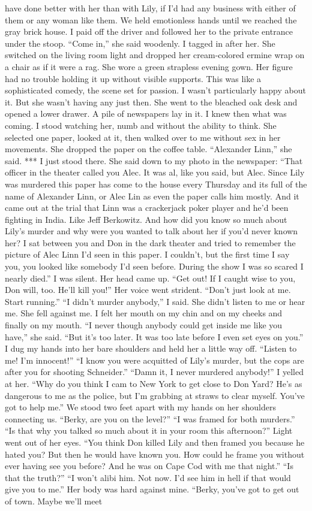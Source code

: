 \documentclass{novel}
\begin{document}
have done better with her than with Lily, if I’d had any business with either of them or any woman like them. We held emotionless hands until we reached the gray brick house. I paid off the driver and followed her to the private entrance under the stoop. “Come in,” she said woodenly. I tagged in after her. She switched on the living room light and dropped her cream-colored ermine wrap on a chair as if it were a rag. She wore a green strapless evening gown. Her figure had no trouble holding it up without visible supports. This was like a sophisticated comedy, the scene set for passion. I wasn’t particularly happy about it. But she wasn’t having any just then. She went to the bleached oak desk and opened a lower drawer. A pile of newspapers lay in it. I knew then what was coming. I stood watching her, numb and without the ability to think. She selected one paper, looked at it, then walked over to me without sex in her movements. She dropped the paper on the coffee table. “Alexander Linn,” she said. *** I just stood there. She said down to my photo in the newspaper: “That officer in the theater called you Alec. It was al, like you said, but Alec. Since Lily was murdered this paper has come to the house every Thursday and its full of the name of Alexander Linn, or Alec Lin as even the paper calls him mostly. And it came out at the trial that Linn was a crackerjack poker player and he’d been fighting in India. Like Jeff Berkowitz. And how did you know so much about Lily’s murder and why were you wanted to talk about her if you’d never known her? I sat between you and Don in the dark theater and tried to remember the picture of Alec Linn I’d seen in this paper. I couldn’t, but the first time I say you, you looked like somebody I’d seen before. During the show I was so scared I nearly died.” I was silent. Her head came up. “Get out! If I caught wise to you, Don will, too. He’ll kill you!” Her voice went strident. “Don’t just look at me. Start running.” “I didn’t murder anybody,” I said. She didn’t listen to me or hear me. She fell against me. I felt her mouth on my chin and on my cheeks and finally on my mouth. “I never though anybody could get inside me like you have,” she said. “But it’s too later. It was too late before I even set eyes on you.” I dug my hands into her bare shoulders and held her a little way off. “Listen to me! I’m innocent!” “I know you were acquitted of Lily’s murder, but the cops are after you for shooting Schneider.” “Damn it, I never murdered anybody!” I yelled at her. “Why do you think I cam to New York to get close to Don Yard? He’s as dangerous to me as the police, but I’m grabbing at straws to clear myself. You’ve got to help me.” We stood two feet apart with my hands on her shoulders connecting us. “Berky, are you on the level?” “I was framed for both murders.” “Is that why you talked so much about it in your room this afternoon?” Light went out of her eyes. “You think Don killed Lily and then framed you because he hated you? But then he would have known you. How could he frame you without ever having see you before? And he was on Cape Cod with me that night.” “Is that the truth?” “I won’t alibi him. Not now. I’d see him in hell if that would give you to me.” Her body was hard against mine. “Berky, you’ve got to get out of town. Maybe we’ll meet 
\end{document}
